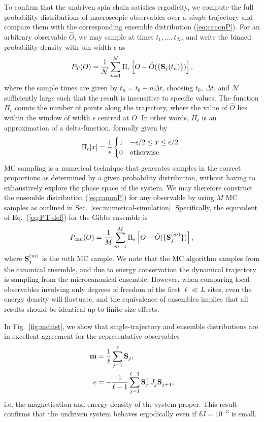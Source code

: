 \documentclass[aps,pre,twocolumn,notitlepage,floats,10pt]{revtex4-1}
\def\ptop{{\vphantom\top}}
\newcommand{\be}{\begin{equation}}
\newcommand{\ee}{\end{equation}}
\newcommand{\beA}{\begin{equation}\begin{aligned}}
\newcommand{\eeA}{\end{aligned}\end{equation}}
\begin{document}
To confirm that the undriven spin chain satisfies ergodicity, we compute the
full probability distributions of macroscopic observables over a \emph{single}
trajectory and compare them with the corresponding ensemble distribution
(\ref{eq:canonP}).
For an arbitrary observable $\hat{O}$, we may sample at times
$t_1,\ldots,t_\mathcal{N}$, and write the binned probability density with bin
width $\epsilon$ as
\be
P_{T}(O) = \frac{1}{\mathcal{N}} \sum_{n=1}^\mathcal{N}
\Pi_{\epsilon} \left[ O - \hat{O}( \{ {\bf S}_j(t_n) \} ) \right]
\label{eq:PT-def} ,
\ee
where the sample times are given by $t_n = t_0 + n \Delta t$, choosing $t_0$,
$\Delta t$, and $\mathcal{N}$ sufficiently large such that the result is
insensitive to specific values.
The function $\Pi_{\epsilon}$ counts the number of points along the
trajectory, where the value of $\hat{O}$ lies within the window of width
$\epsilon$ centred at $O$.
In other words, $\Pi_\epsilon$ is an approximation of a delta-function, formally
given by
\be
\Pi_\epsilon[x] = \frac{1}{\epsilon} 
\begin{cases}  1 & -\epsilon/2 \leq x \leq \epsilon/2 \\ 0 & {\rm otherwise}
\end{cases}
.
\ee
MC sampling is a numerical technique that generates samples in the correct
proportions as determined by a given probability distribution, without having
to exhaustively explore the phase space of the system.
We may therefore construct the ensemble distribution (\ref{eq:canonP}) for any
observable by using $M$ MC samples as outlined in
Sec.~\ref{sec:numerical-simulation}.
Specifically, the equivalent of Eq.~(\ref{eq:PT-def}) for the Gibbs ensemble is
\be
P_{{\rm can}}(O) = \frac{1}{M} \sum_{m=1}^M
\Pi_{\epsilon} \left[ O - \hat{O}( \{ {\bf S}_j^{(m)} \} ) \right]
,
\label{eq:PMC-def}
\ee
where ${\bf S}_j^{(m)}$ is the $m$th MC sample.
We note that the MC algorithm samples from the canonical ensemble, and due to
energy conservation the dynamical trajectory is sampling from the
microcanonical ensemble.
However, when comparing local observables involving only degrees of freedom of
the first $\ell\ll L$ sites, even the energy density will fluctuate, and the
equivalence of ensembles implies that all results should be identical up to
finite-size effects.

In Fig.~\ref{fig:mchist}, we show that single-trajectory and ensemble
distributions are in excellent agreement for the representative observables
\beA
{\bf m} &= \frac{1}{\ell} \sum_{j=1}^\ell {\bf S}_j, \\
e &= -\frac{1}{\ell-1} \sum_{j=1}^{\ell-1} {\bf S}_j^\top J^\ptop_j {\bf S}^\ptop_{j+1},
\label{eq:el}
\eeA
i.e. the magnetisation and energy density of the system proper.
This result confirms that the undriven system behaves ergodically even if
$\delta J = 10^{-3}$ is small.
\end{document}
